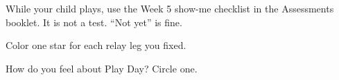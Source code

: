 \begin{grownup}[Show me]
While your child plays, use the Week 5 show-me checklist in the Assessments booklet. It is not a test. \enquote{Not yet} is fine.
\end{grownup}

\begin{vocab}
\end{vocab}

\begin{reflection}
Color one star for each relay leg you fixed.

\begin{center}
\Huge\faStar[regular]\qquad\faStar[regular]\qquad\faStar[regular]
\end{center}

How do you feel about Play Day? Circle one.

\begin{center}
\Huge\faSmile[regular]\qquad\faMeh[regular]\qquad\faFrown[regular]
\end{center}
\end{reflection}

